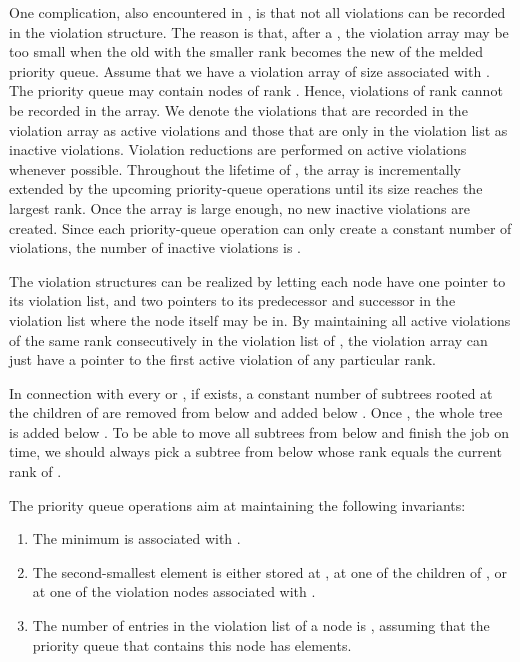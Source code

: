 \documentclass{llncs}
\newcommand{\Decrease}{\mbox{}}
\newcommand{\Meld}{\mbox{}}
\begin{document}
One complication, also encountered in \cite{Bro96}, 
is that not all violations can be recorded in the violation structure.
The reason is that, after a \Meld{}, the violation array may be 
too small when the old  with the
smaller rank becomes the new  of the melded priority queue.
Assume that we have a violation array of size  associated with
.  The priority queue may contain nodes of rank .
Hence, violations of rank  cannot be recorded in the
array.  We denote the violations that are recorded in the violation
array as active violations and those that are only in the
violation list as inactive violations.  Violation reductions
are performed on active violations whenever possible.  Throughout the
lifetime of , the array is incrementally extended by the upcoming
priority-queue operations until its size reaches the largest rank.
Once the array is large enough, no new inactive violations are
created.  Since each priority-queue operation can only create a
constant number of violations, the number of inactive violations is
.

The violation structures can be realized by letting each node have one
pointer to its violation list, and two pointers to its predecessor and
successor in the violation list where the node itself may be in. By
maintaining all active violations of the same rank consecutively in
the violation list of , the violation array can just have a
pointer to the first active violation of any particular rank.

In connection with every \Decrease{} or \Meld{}, if  exists, a constant number of subtrees 
rooted at the children of  are removed from below  and added below .  
Once , the whole tree  is added below .
To be able to move all subtrees from below  and
finish the job on time, we should always pick a subtree
from below  whose rank equals the current rank of .  

The priority queue operations aim at maintaining the following invariants:

\begin{enumerate}
\vspace{-.1in}
\item
The minimum is associated with .  
\item
The second-smallest element is either stored at , at one of the children of
, or at one of the violation nodes associated with .
\item
The number of entries in the violation list of a node is ,
assuming that the priority queue that contains this node has  elements.
\vspace{-.05in}
\end{enumerate}
\end{document}
